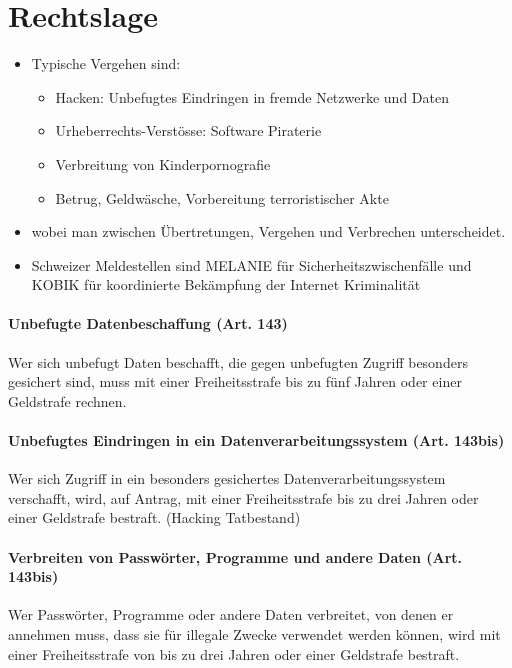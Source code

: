 \section{Rechtslage}
\begin{itemize}
	\item Typische Vergehen sind:
	\begin{itemize}
		\item Hacken: Unbefugtes Eindringen in fremde Netzwerke und Daten
		\item Urheberrechts-Verstösse: Software Piraterie
		\item Verbreitung von Kinderpornografie
		\item Betrug, Geldwäsche, Vorbereitung terroristischer Akte
	\end{itemize}
	\item wobei man zwischen Übertretungen, Vergehen und Verbrechen unterscheidet.
	\item Schweizer Meldestellen sind MELANIE für Sicherheitszwischenfälle und KOBIK für koordinierte Bekämpfung der Internet Kriminalität
\end{itemize}

\paragraph{Unbefugte Datenbeschaffung (Art. 143)}
Wer sich unbefugt Daten beschafft, die gegen unbefugten Zugriff besonders gesichert sind, muss mit einer Freiheitsstrafe bis zu fünf Jahren oder einer Geldstrafe rechnen.

\paragraph{Unbefugtes Eindringen in ein Datenverarbeitungssystem (Art. 143bis)}
Wer sich Zugriff in ein besonders gesichertes Datenverarbeitungssystem verschafft, wird, auf Antrag,  mit einer Freiheitsstrafe bis zu drei Jahren oder einer Geldstrafe bestraft. (Hacking Tatbestand)

\paragraph{Verbreiten von Passwörter, Programme und andere Daten (Art. 143bis)}
Wer Passwörter, Programme oder andere Daten verbreitet, von denen er annehmen muss, dass sie für illegale Zwecke verwendet werden können, wird mit einer Freiheitsstrafe von bis zu drei Jahren oder einer Geldstrafe bestraft.

